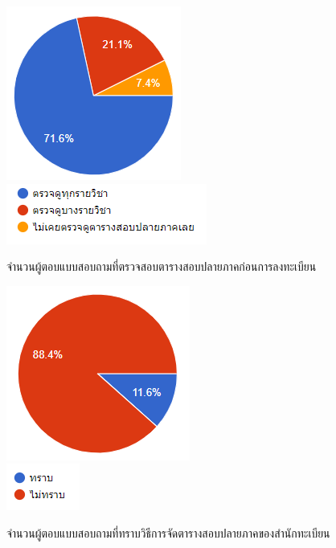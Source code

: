 \begin{figure}
\begin{center}
\includegraphics{images/check_enrollment.png}\\[2ex]
\includegraphics{images/type_check_enrollment.png}
\end{center}
\caption[Poem]{จำนวนผู้ตอบแบบสอบถามที่ตรวจสอบตารางสอบปลายภาคก่อนการลงทะเบียน}
\label{fig:enroll}     
\end{figure}

\begin{figure}
\begin{center}
\includegraphics{images/Create_exam.png}\\[2ex]
\includegraphics{images/type_Create_exam.png}
\end{center}
\caption[Poem]{จำนวนผู้ตอบแบบสอบถามที่ทราบวิธีการจัดตารางสอบปลายภาคของสำนักทะเบียน}
\label{fig:Create_exam}     
\end{figure}

